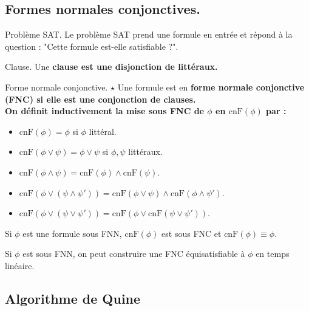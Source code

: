 \documentclass[french, 11pt]{article}
\newcommand*{\cnF}{\text{cnF}}
\begin{document}
\subsection{Formes normales conjonctives.}

\begin{defi}{Problème SAT.}{}
    Le problème SAT prend une formule en entrée et répond à la question : "Cette formule est-elle satisfiable ?".
\end{defi}

\begin{defi}{Clause.}{}
    Une \bf{clause} est une disjonction de littéraux.
\end{defi}

\begin{defi}{Forme normale conjonctive. $\star$}{}
    Une formule est en \bf{forme normale conjonctive (FNC)} si elle est une conjonction de clauses.\\
    On définit inductivement la mise sous FNC de $\phi$ en $\cnF(\phi)$ par :
    \begin{itemize}[topsep=0pt,itemsep=-0.9 ex]
        \item $\cnF(\phi)=\phi$ si $\phi$ littéral.
        \item $\cnF(\phi\lor\psi)=\phi\lor\psi$ si $\phi,\psi$ littéraux.
        \item $\cnF(\phi\land\psi)=\cnF(\phi)\land\cnF(\psi)$.
        \item $\cnF(\phi\lor(\psi\land\psi'))=\cnF(\phi\lor\psi)\land\cnF(\phi\land\psi')$.
        \item $\cnF(\phi\lor(\psi\lor\psi'))=\cnF(\phi\lor\cnF(\psi\lor\psi'))$.
    \end{itemize}
\end{defi}

\begin{prop}{}{}
    Si $\phi$ est une formule sous FNN, $\cnF(\phi)$ est sous FNC et $\cnF(\phi)\equiv\phi$.
\end{prop}

\begin{prop}{}{}
    Si $\phi$ est sous FNN, on peut construire une FNC équisatisfiable à $\phi$ en temps linéaire.
\end{prop}

\subsection{Algorithme de Quine}
\end{document}

